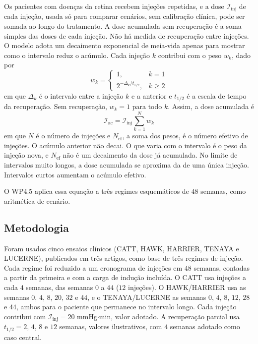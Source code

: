 Os pacientes com doenças da retina recebem injeções repetidas, e a dose $\mathcal{I}_{\mathrm{inj}}$ de cada injeção, usada só para comparar cenários, sem calibração clínica, pode ser somada ao longo do tratamento. A dose acumulada sem recuperação é a soma simples das doses de cada injeção. Não há medida de recuperação entre injeções. O modelo adota um decaimento exponencial de meia-vida apenas para mostrar como o intervalo reduz o acúmulo. Cada injeção $k$ contribui com o peso $w_k$, dado por
\begin{equation}
w_k=\begin{cases}1, & k=1\\ 2^{-\Delta_k/t_{1/2}}, & k\ge 2\end{cases}
\label{eq_wp45_peso}
\end{equation}
em que $\Delta_k$ é o intervalo entre a injeção $k$ e a anterior e $t_{1/2}$ é a escala de tempo da recuperação. Sem recuperação, $w_k=1$ para todo $k$. Assim, a dose acumulada é
\begin{equation}
\mathcal{I}_{\text{ac}}=\mathcal{I}_{\text{inj}}\sum_{k=1}^{N}w_k
\label{eq_wp45_cum}
\end{equation}
em que $N$ é o número de injeções e $N_{\text{ef}}$, a soma dos pesos, é o número efetivo de injeções. O acúmulo anterior não decai. O que varia com o intervalo é o peso da injeção nova, e $N_{\text{ef}}$ não é um decaimento da dose já acumulada. No limite de intervalos muito longos, a dose acumulada se aproxima da de uma única injeção. Intervalos curtos aumentam o acúmulo efetivo.

O WP4.5 aplica essa equação a três regimes esquemáticos de $48$ semanas, como aritmética de cenário.

\subsection{Metodologia}

Foram usados cinco ensaios clínicos (CATT, HAWK, HARRIER, TENAYA e LUCERNE), publicados em três artigos, como base de três regimes de injeção. Cada regime foi reduzido a um cronograma de injeções em $48$ semanas, contadas a partir da primeira e com a carga de indução incluída. O CATT \citep{catt2012} usa injeções a cada $4$ semanas, das semanas $0$ a $44$ ($12$ injeções). O HAWK/HARRIER \citep{dugel2020hawkharrier} usa as semanas $0$, $4$, $8$, $20$, $32$ e $44$, e o TENAYA/LUCERNE \citep{heier2022tenaya} as semanas $0$, $4$, $8$, $12$, $28$ e $44$, ambos para o paciente que permanece no intervalo longo. Cada injeção contribui com $\mathcal{I}_{\mathrm{inj}}=20$ mmHg$\cdot$min, valor adotado. A recuperação parcial usa $t_{1/2}=2$, $4$, $8$ e $12$ semanas, valores ilustrativos, com $4$ semanas adotado como caso central.

